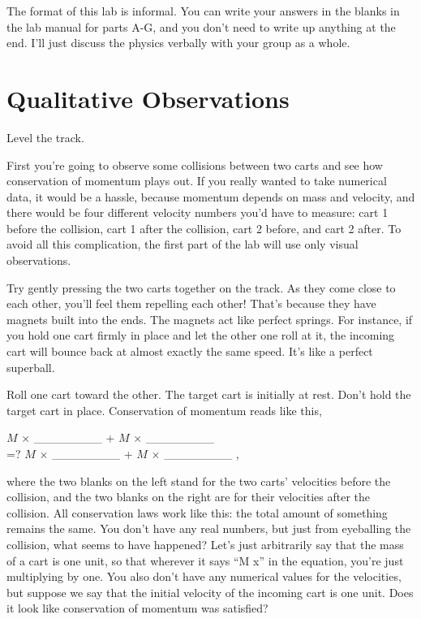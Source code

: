 \label{lab:momentum}

\apparatus
{}

The format of this lab is informal. You can write your answers in the blanks in the lab
manual for parts A-G, and you don't need to write up anything at the end. I'll just discuss
the physics verbally with your group as a whole.

\section*{Qualitative Observations}
Level the track.

First you're going to observe some collisions between two carts and see how
 conservation of momentum plays out. If you really wanted to take numerical data, it
 would be a hassle, because momentum depends on mass and velocity, and there would be
 four different velocity numbers you'd have to measure: cart 1 before the collision, cart 1
 after the collision, cart 2 before, and cart 2 after. To avoid all this complication, the
 first part of the lab will use only visual observations.

Try gently pressing the two carts together on the track. As they come close to each
 other, you'll feel them repelling each other! That's because they have magnets built
 into the ends. The magnets act like perfect springs. For instance, if you hold one
 cart firmly in place and let the other one roll at it, the incoming cart will bounce back
 at almost exactly the same speed. It's like a perfect superball. 

Roll one cart toward the other. The target cart is initially at rest. Don't hold the target cart in place. Conservation of momentum reads like this,

\newcommand{\momentumeqn}[2]{%
        #1 $\times$ \_\_\_\_\_\_\_\_ + #2 $\times$ \_\_\_\_\_\_\_\_ \\
        \hfill =?
        #1 $\times$ \_\_\_\_\_\_\_\_ + #2 $\times$ \_\_\_\_\_\_\_\_
 \qquad ,}

\momentumeqn{$M$}{$M$}

where the two blanks on the left stand for the two carts' velocities before the collision, and the two
 blanks on the right are for their velocities after the collision. All conservation laws work like this: the
 total amount of something remains the same. You don't have any real numbers, but just from eyeballing the
 collision, what seems to have happened? Let's just arbitrarily say that the mass of a cart is one unit, so
 that wherever it says ``M x'' in the equation, you're just multiplying by one. You also don't have any numerical values
 for the velocities, but suppose we say that the initial velocity of the incoming cart is one unit. Does it
 look like conservation of momentum was satisfied?

